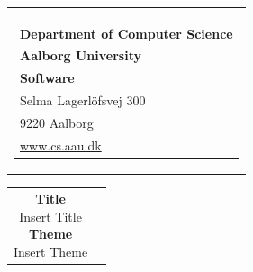 


\thispagestyle{empty}

\begin{nopagebreak}
{
\samepage 
\begin{tabular}{r}
\parbox{\textwidth}
{
    \hfill \parbox{4.9cm}
    {
        \begin{tabular}{l}
            {\sf\small \textbf{Department of Computer Science}}\\
            {\sf\small \textbf{Aalborg University}}\\
            {\sf\small \textbf{Software}} \\
            {\sf\small Selma Lagerl\"{o}fsvej 300} \\
            {\sf\small 9220{  }Aalborg} \\
            {\sf\small \url{www.cs.aau.dk}}
        \end{tabular}
    }
}
\\
\end{tabular}

\begin{tabular}{cc}

    \parbox{8cm}
    {
        \textbf{Title}  \\
        Insert Title           \\

        \textbf{Theme}  \\ 
        Insert Theme           \\

}
\end{tabular}}
\end{nopagebreak}
